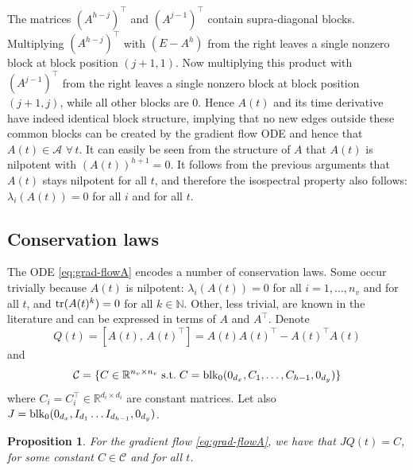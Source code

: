\documentclass{article}
\makeatletter
\renewenvironment{proof}[1][\proofname]{
  \par\pushQED{\qed}\normalfont
  \topsep6\p@\@plus6\p@\relax
  \trivlist\item[\hskip\labelsep\bfseries#1\@addpunct{.}]
  \ignorespaces
}{
  \popQED\endtrivlist\@endpefalse
}
\newtheorem{proposition}{Proposition}
\def\tr{{\rm tr}}
\def\block{{\rm blk}}
\newcommand{\1}{\mathds{1}}
\makeatother
\begin{document}
\begin{proof}
The matrices $(A^{h-j})^\top$ and $(A^{j-1})^\top$ contain supra-diagonal blocks. Multiplying $(A^{h-j})^\top$ with $(E - A^{h})$ from the right leaves a single nonzero block at block position $(j+1,1)$. Now multiplying this product with $(A^{j-1})^\top$ from the right leaves a single nonzero block at block position $(j+1,j)$, while all other blocks are 0. 
Hence $A(t)$ and its time derivative have indeed identical block structure, implying that no new edges outside these common blocks can be created by the gradient flow ODE and hence that $ A(t) \in \mathcal{A} $ $ \forall \, t$.
It can easily be seen from the structure of $A$ that $A(t)$ is nilpotent with $(A(t))^{h+1}=0$. It follows from the previous arguments that $ A(t)$ stays nilpotent for all $t$, and therefore the isospectral property also follows: $ \lambda_i(A(t))=0$ for all $i$ and for all $t$. 
\end{proof}

\subsection{Conservation laws}
\label{sec:conserv_law}

The ODE \eqref{eq:grad-flowA} encodes a number of conservation laws.
Some occur trivially because $ A(t) $ is nilpotent: $ \lambda_i(A(t)) =0 $ for all $ i =1,\ldots, n_v $ and for all $ t$, and $ \tr(A(t)^k) =0 $ for all $  k\in \mathbb{N}$.
Other, less trivial, are known in the literature \cite{saxe2013exact,chitour2018geometric} and can be expressed in terms of $A$ and $A^\top$.
Denote \begin{equation}
\label{eq:Q}
Q(t) = [A(t), \, A(t)^\top ]= A(t) A(t)^\top - A(t)^\top A(t) 
\end{equation} 
and
\[
\mathcal{C} =\{ C \in \mathbb{R}^{n_v \times n_v }\;  \text{s.t.} \; C=  \block_0 (0_{d_x}, C_1, \ldots, C_{h-1} , 0_{d_y} ) \}
\]
where $ C_i = C_i^\top \in \mathbb{R}^{d_i \times d_i } $ are constant matrices.
Let also $ J= \block_0 (0_{d_x}, I_{d_1} \ldots  I_{d_{h-1}} , 0_{d_y} ) $.

\begin{proposition}
\label{prop:conserv-law-A}
For the gradient flow \eqref{eq:grad-flowA}, we have that $ J Q(t) = C$, for some constant $ C \in \mathcal{C} $ and for all $ t$. 
\end{proposition} 
\end{document}
